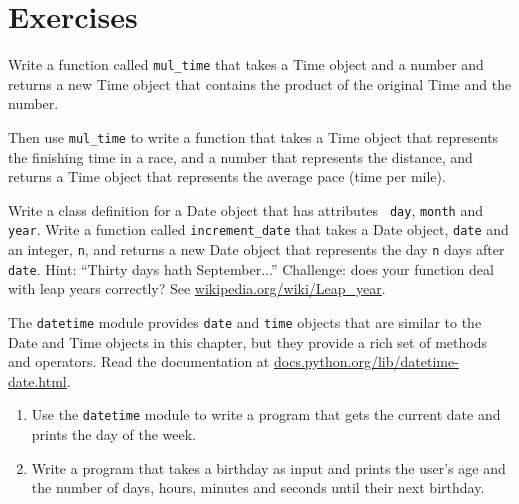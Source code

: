 \section{Exercises}

\begin{exercise}
Write a function called \verb"mul_time" that takes a Time object
and a number and returns a new Time object that contains
the product of the original Time and the number.

Then use \verb"mul_time" to write a function that takes a Time
object that represents the finishing time in a race, and a number
that represents the distance, and returns a Time object that represents
the average pace (time per mile).


\end{exercise}

\begin{exercise}


Write a class definition for a Date object that has attributes {\tt
  day}, {\tt month} and {\tt year}.  Write a function called
\verb"increment_date" that takes a Date object, {\tt date} and an
integer, {\tt n}, and returns a new Date object that
represents the day {\tt n} days after {\tt date}.  Hint:
``Thirty days hath September...''  Challenge: does your function
deal with leap years correctly?  See \url{wikipedia.org/wiki/Leap_year}.

\end{exercise}


\begin{exercise}


The {\tt datetime} module provides {\tt date} and {\tt time} objects
that are similar to the Date and Time objects in this chapter, but
they provide a rich set of methods and operators.  Read the
documentation at \url{docs.python.org/lib/datetime-date.html}.

\begin{enumerate}

\item Use the {\tt datetime} module to write a program that
gets the current date and prints the day of the week.


\item Write a program that takes a birthday as input
and prints the user's age and the number of days, hours,
minutes and seconds until their next birthday.
\end{enumerate}

\end{exercise}







